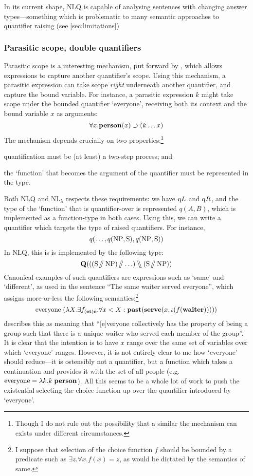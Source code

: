 In its current shape, NLQ is capable of analysing sentences with
changing answer types---something which is problematic to many
semantic approaches to quantifier raising (see \autoref{sec:limitations})





\subsubsection{Parasitic scope, double quantifiers}
Parasitic scope is a interesting mechanism, put forward by
\citet{barker2007}, which allows expressions to capture another
quantifier's scope. Using this mechanism, a parasitic expression can
take scope \emph{right} underneath another quantifier, and capture the
bound variable. For instance, a parasitic expression $k$ might take
scope under the bounded quantifier `everyone', receiving both its
context and the bound variable $x$ as arguments:
\[
  \forall{x}.\PERSON(x)\supset(k\ldots{x})
\]
The mechanism depends crucially on two properties:\footnote{%
  Though I do not rule out the possibility that a similar the
  mechanism can exists under different circumstances.
}
\begin{enumerate*}[label=(\arabic*)]
\item quantification must be (at least) a two-step process; and
\item the `function' that becomes the argument of the quantifier must
  be represented in the type.
\end{enumerate*}
Both NLQ and NL$_\lambda$ respects these requirements: we have $\qup$
and $\qdown$, and the type of the `function' that is quantifier-over
is represented $q(A,B)$, which is implemented as a function-type in
both cases. Using this, we can write a quantifier which targets the
type of raised quantifiers. For instance,
\[
  q(\ldots,q(\NP,\S),q(\NP,\S))
\]
In NLQ, this is is implemented by the following type:
\[
  \q[((\S\himpl\NP)\himpl\ldots)\himpr(\S\himpl\NP)]
\]
Canonical examples of such quantifiers are expressions such as `same'
and `different', as used in the sentence ``The same waiter served
everyone'', which \citet{barker2007} assigns more-or-less the
following semantics:\footnote{%
  I suppose that selection of the choice function $f$ should be
  bounded by a predicate such as $\exists{z}.\forall{x}.f(x)=z$, as
  would be dictated by the semantics of same.
}
\[
  \text{everyone}\;(\lambda{X}.\exists{f_{(\e\t)\e}}.\forall{x<X}:
  \PAST(\SERVE(x,\iota(f(\WAITER)))))
\]
\citeauthor{barker2007} describes this as meaning that ``[e]veryone
collectively has the property of being a group such that there is a
unique waiter who served each member of the group''. It is clear that
the intention is to have $x$ range over the same set of variables over
which `everyone' ranges. However, it is not entirely clear to me how
`everyone' should reduce---it is ostensibly not a quantifier, but a
function which takes a continuation and provides it with the set of
all people (e.g.\ $\text{everyone}=\lambda{k}.k\;\PERSON$). All this
seems to be a whole lot of work to push the existential selecting the
choice function up over the quantifier introduced by `everyone'.

